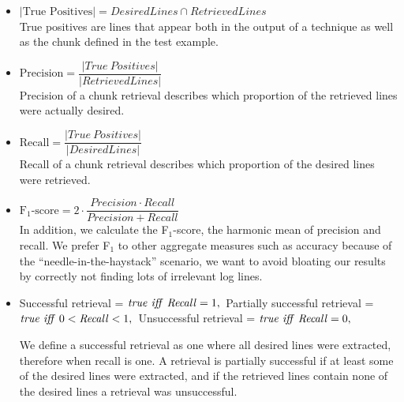 \vspace{0.2cm}
\begin{itemize}[leftmargin=0.4cm] \itemsep1em
	\item $|\mbox{True\ Positives}| = \mathit{DesiredLines} \cap
	\mathit{RetrievedLines}$ \vspace{0.2cm}\\
	True positives are lines that appear both in the output of a
	technique as well as the chunk defined in the
  test example.


	\item $\mbox{Precision} = \dfrac{|\mathit{True\
	Positives}|}{|\mathit{RetrievedLines}|}$ \vspace{0.21cm} \\
	Precision of a chunk retrieval describes which proportion of
	the retrieved lines were actually desired.

	\item $\mbox{Recall} =
	\dfrac{|\mathit{True\ Positives}|}{|\mathit{DesiredLines}|}$
	\vspace{0.2cm} \\
	Recall of a chunk retrieval describes which proportion of the
	desired lines were retrieved.

	\item $\mbox{F$_{1}$-score} = 2 \cdot \dfrac{\mathit{Precision}
	\cdot \mathit{Recall}}{\mathit{Precision} + \mathit{Recall}}$
	\vspace{0.2cm}\\
	In addition, we calculate the F$_{1}$-score, the harmonic mean
	of precision and recall.
  We prefer F$_{1}$ to other aggregate
	measures such as accuracy because of the
	``needle-in-the-haystack'' scenario, we want to avoid bloating
	our results by correctly not finding lots of irrelevant log
	lines.

	\item Successful retrieval = $\mathit{true}\ \mathit{iff}\
	\mathit{Recall} = 1, \vspace{0.1cm}\\$
	Partially successful retrieval = $\mathit{true}\ \mathit{iff}\
	0<\mathit{Recall}<1, \vspace{0.1cm}\\$
	Unsuccessful retrieval = $\mathit{true}\ \mathit{iff}\
	\mathit{Recall} = 0, \vspace{0.1cm}$

	We define a successful retrieval as one where all desired
	lines were extracted, therefore when recall is one.
	A retrieval is partially successful if at least some of the
	desired lines were extracted,
	and if the retrieved lines contain none of the desired lines
	a retrieval was unsuccessful.
\end{itemize}

